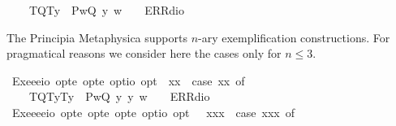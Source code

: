 \begin{isabellebody}
\ \ \ \ {\isacharparenleft}T{\isacharparenleft}Q{\isacharparenright}{\isacharcomma}T{\isacharparenleft}y{\isacharparenright}{\isacharparenright}\ {\isasymRightarrow}\ P{\isacharparenleft}{\isasymlambda}w{\isachardot}{\isacharparenleft}Q\ y{\isacharparenright}\ w{\isacharparenright}\ {\isacharbar}\ {\isacharunderscore}\ {\isasymRightarrow}\ ERR{\isacharparenleft}dio{\isacharparenright}{\isachardoublequoteclose}%
\begin{isamarkuptext}%
The Principia Metaphysica supports $n$-ary exemplification constructions. For pragmatical 
 reasons we consider here the cases only for $n\leq 3$.%
\end{isamarkuptext}%
\isamarkuptrue%
\isamarkupfalse%
\ Exe{}{\isacharcolon}{\isacharcolon}{\isachardoublequoteopen}{\isacharparenleft}e{\isasymRightarrow}e{\isasymRightarrow}io{\isacharparenright}\ opt{\isasymRightarrow}e\ opt{\isasymRightarrow}e\ opt{\isasymRightarrow}io\ opt{\isachardoublequoteclose}{\isacharparenleft}{\isachardoublequoteopen}{\isasymlparr}{\isacharunderscore}{\isacharcomma}{\isacharunderscore}{\isacharcomma}{\isacharunderscore}{\isasymrparr}{\isachardoublequoteclose}{\isacharparenright}\ \ {\isachardoublequoteopen}{\isasymlparr}{\isasymPhi}{\isacharcomma}x{}{\isacharcomma}x{}{\isasymrparr}\ {\isasymequiv}\ case\ {\isacharparenleft}{\isasymPhi}{\isacharcomma}x{}{\isacharcomma}x{}{\isacharparenright}\ of\ \isanewline
\ \ \ \ {\isacharparenleft}T{\isacharparenleft}Q{\isacharparenright}{\isacharcomma}T{\isacharparenleft}y{}{\isacharparenright}{\isacharcomma}T{\isacharparenleft}y{}{\isacharparenright}{\isacharparenright}\ {\isasymRightarrow}\ P{\isacharparenleft}{\isasymlambda}w{\isachardot}{\isacharparenleft}Q\ y{}\ y{}{\isacharparenright}\ w{\isacharparenright}\ {\isacharbar}\ {\isacharunderscore}\ {\isasymRightarrow}\ ERR{\isacharparenleft}dio{\isacharparenright}{\isachardoublequoteclose}\isanewline
{}\isamarkupfalse%
\ Exe{}{\isacharcolon}{\isacharcolon}{\isachardoublequoteopen}{\isacharparenleft}e{\isasymRightarrow}e{\isasymRightarrow}e{\isasymRightarrow}io{\isacharparenright}\ opt{\isasymRightarrow}e\ opt{\isasymRightarrow}e\ opt{\isasymRightarrow}e\ opt{\isasymRightarrow}io\ opt{\isachardoublequoteclose}{\isacharparenleft}{\isachardoublequoteopen}{\isasymlparr}{\isacharunderscore}{\isacharcomma}{\isacharunderscore}{\isacharcomma}{\isacharunderscore}{\isacharcomma}{\isacharunderscore}{\isasymrparr}{\isachardoublequoteclose}{\isacharparenright}\ \ \ {\isachardoublequoteopen}{\isasymlparr}{\isasymPhi}{\isacharcomma}x{}{\isacharcomma}x{}{\isacharcomma}x{}{\isasymrparr}\ {\isasymequiv}\ case\ {\isacharparenleft}{\isasymPhi}{\isacharcomma}x{}{\isacharcomma}x{}{\isacharcomma}x{}{\isacharparenright}\ of\ \isanewline

\end{isabellebody}
